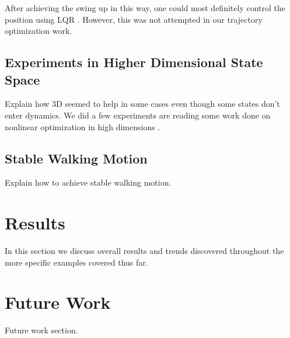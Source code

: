 \documentclass[conference]{IEEEtran}
\begin{document}
After achieving the swing up in this way, one could most definitely control the position using LQR \cite{b1}. However, this was not attempted in our trajectory optimization work.

\subsection{Experiments in Higher Dimensional State Space}
Explain how 3D seemed to help in some cases even though some states don't enter dynamics. We did a few experiments are reading some work done on nonlinear optimization in high dimensions \cite{b5}.

\subsection{Stable Walking Motion}

Explain how to achieve stable walking motion.

\section*{Results}

In this section we discuss overall results and trends discovered throughout the more specific examples covered thus far.

\section*{Future Work}

Future work section.
\end{document}
